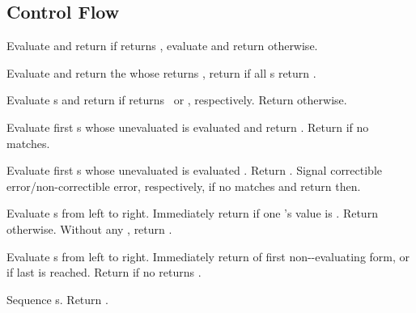 \subsection{Control Flow}
\begin{LIST}{1cm}

  {Evaluate and return
   if  returns \T, evaluate and return
   otherwise.
  }

  {
  Evaluate and return the
   whose  returns \T, return
  \retval{\NIL} if all s return \NIL.
  }

  {
  Evaluate s and return  if
   returns \T\ or \NIL, respectively. Return \retval{\NIL} otherwise.
  }

  {
  Evaluate first s whose unevaluated  is
   evaluated  and return .
  Return  if no  matches. 
  }

  {
  Evaluate first s whose unevaluated  is  evaluated
  . Return . Signal correctible error/non-correctible error,
  respectively, if no  matches and return \retval{\NIL} then.
  }

  {
  Evaluate s from left to
  right. Immediately return \retval{\NIL} if one 's value is \NIL. Return
   otherwise. Without any ,
  return \retval{\NIL}.
  }

  {
  Evaluate s from left to
  right. Immediately return  of first
  non-\NIL-evaluating form, or  if last 
  is reached. Return \retval{\NIL} if no  returns \T.
  }

  {Sequence s. Return
  .
  }


\end{LIST}

